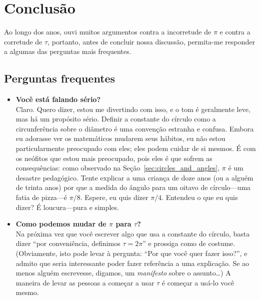 
\section{Conclusão}
\label{sec:conclusion}

Ao longo dos anos, ouvi muitos argumentos contra a incorretude de $\pi$ e contra a corretude de $\tau$, portanto, antes de concluir nossa discussão, permita-me responder a algumas das perguntas mais frequentes.

  \subsection{Perguntas frequentes} %
  \label{sec:faq}

\begin{itemize}

  \item \textbf{Você está falando sério?} \\ Claro. Quero dizer, estou me divertindo com isso, e o tom é geralmente leve, mas há um propósito sério. Definir a constante do círculo como a circunferência sobre o diâmetro é uma convenção estranha e confusa. Embora eu adorasse ver os matemáticos mudarem seus hábitos, eu não estou particularmente preocupado com eles; eles podem cuidar de si mesmos. É com os neófitos que estou mais preocupado, pois eles é que sofrem as consequências: como observado na Seção~\ref{sec:circles_and_angles}, $\pi$ é um desastre pedagógico. Tente explicar a uma criança de doze anos (ou a alguém de trinta anos) por que a medida do ângulo para um oitavo de círculo---uma fatia de pizza---é $\pi/8$. Espere, eu quis dizer $\pi/4$. Entendeu o que eu quis dizer? É loucura---pura e simples.

  \item \textbf{Como podemos mudar de $\pi$ para $\tau$?} \\ Na próxima vez que você escrever algo que usa a constante do círculo, basta dizer ``por conveniência, definimos $\tau = 2\pi$'' e prossiga como de costume. (Obviamente, isto pode levar à pergunta: ``Por que você quer fazer isso?'', e admito que seria interessante poder fazer referência a uma explicação. Se ao menos alguém escrevesse, digamos, um \emph{manifesto} sobre o assunto\ldots) A maneira de levar as pessoas a começar a usar $\tau$ é começar a usá-lo você mesmo.


\end{itemize}
